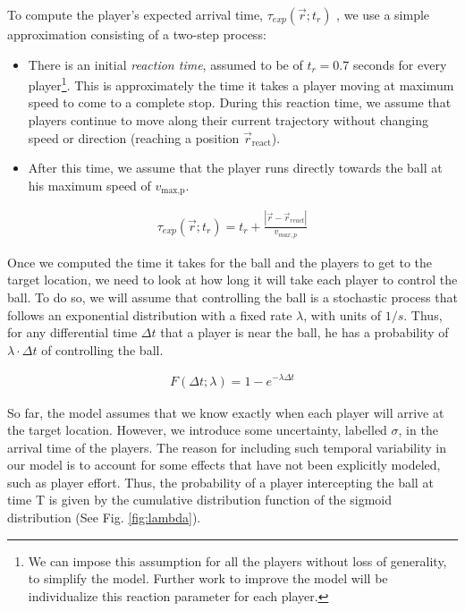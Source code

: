 \documentclass[
  twoside,nohyper]{book}
\providecommand{\tightlist}{%
  \setlength{\itemsep}{0pt}\setlength{\parskip}{0pt}}
\begin{document}
To compute the player's expected arrival time, \(\tau_{exp}(\vec{r};t_r)\) , we use a simple approximation consisting of a two-step process:

\begin{itemize}
\tightlist
\item
  There is an initial \emph{reaction time}, assumed to be of \(t_{r} = 0.7\) seconds for every player\footnote{We can impose this assumption for all the players without loss of generality, to simplify the model. Further work to improve the model will be individualize this reaction parameter for each player.}. This is approximately the time it takes a player moving at maximum speed to come to a complete stop. During this reaction time, we assume that players continue to move along their current trajectory without changing speed or direction (reaching a position \(\vec{r}_{\text{react}}\)).
\item
  After this time, we assume that the player runs directly towards the ball at his maximum speed of \(v_{\text{max,p}}\).
\end{itemize}

\begin{align}
    \tau_{exp}(\vec{r} ; t_r) = t_r + \frac{|\vec{r} - \vec{r}_{react}|}{v_{max,p}}
    \label{exp_arr_time}
\end{align}

Once we computed the time it takes for the ball and the players to get to the target location, we need to look at how long it will take each player to control the ball. To do so, we will assume that controlling the ball is a stochastic process that follows an exponential distribution with a fixed rate \(\lambda\), with units of \(1/s\). Thus, for any differential time \(\Delta t\) that a player is near the ball, he has a probability of \(\lambda \cdot \Delta t\) of controlling the ball.

\begin{align}
F(\Delta t ; \lambda)=1-e^{-\lambda \Delta t}
\end{align}

So far, the model assumes that we know exactly when each player will arrive at the target location. However, we introduce some uncertainty, labelled \(\sigma\), in the arrival time of the players. The reason for including such temporal variability in our model is to account for some effects that have not been explicitly modeled, such as player effort. Thus, the probability of a player intercepting the ball at time T is given by the cumulative distribution function of the sigmoid distribution (See Fig. \ref{fig:lambda}).
\end{document}
